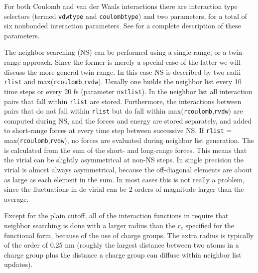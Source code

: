 For both Coulomb and van der Waals interactions there are interaction
type selectors
(termed {\tt vdwtype} and {\tt coulombtype}) and two parameters,
for a total of six nonbonded interaction parameters. See  for a complete
description of these parameters.

The neighbor searching (NS) can be performed using a single-range, or a twin-range 
approach. Since the former is merely a special case of the latter we will 
discuss the more general twin-range. In this case NS is described by two
radii {\tt rlist} and max({\tt rcoulomb},{\tt rvdw}).
Usually one builds the neighbor list every 10 time steps
or every 20 fs (parameter {\tt nstlist}). In the neighbor list all interaction 
pairs that  fall within {\tt rlist} are stored. Furthermore, the 
interactions between pairs that do not
fall within {\tt rlist} but do fall within max({\tt rcoulomb},{\tt rvdw})
are computed during NS, and the
forces and energy are stored separately, and added to short-range forces
at every time step between successive NS. If {\tt rlist} = 
max({\tt rcoulomb},{\tt rvdw}), no forces
are evaluated during neighbor list generation.
The  is calculated from the sum of the short- and
long-range forces.
This means that the virial can be slightly asymmetrical at non-NS steps.
In single precision the virial is almost always asymmetrical, because the
off-diagonal elements are about as large as each element in the sum.
In most cases this is not really a problem, since the fluctuations in de
virial can be 2 orders of magnitude larger than the average.

Except for the plain cutoff,
all of the interaction functions in 
require that neighbor searching is done with a larger radius than the $r_c$
specified for the functional form, because of the use of charge groups.
The extra radius is typically of the order of 0.25 nm (roughly the 
largest distance between two atoms in a charge group plus the distance a 
charge group can diffuse within neighbor list updates).


